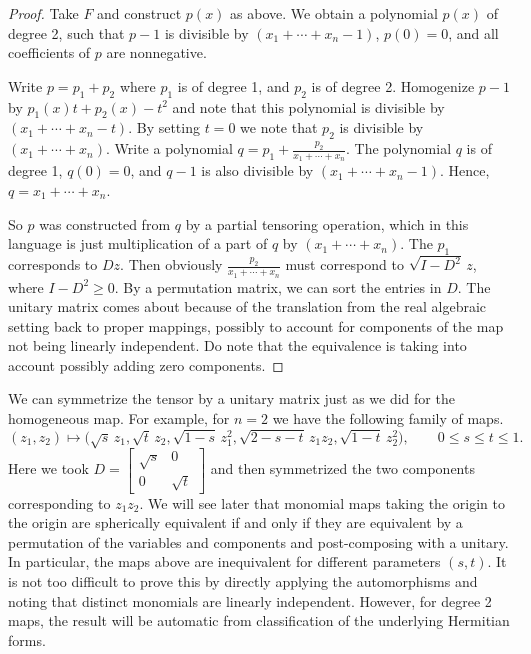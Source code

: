 \documentclass[12pt,openany]{book}
\theoremstyle{plain}
\theoremstyle{remark}
\theoremstyle{definition}
\theoremstyle{exercise}
\theoremstyle{example}
\begin{document}
\begin{proof}
Take $F$ and construct $p(x)$ as above.
We obtain a
polynomial $p(x)$ of degree 2, such that
$p-1$ is divisible by
$(x_1+\cdots+x_n-1)$, $p(0) = 0$, and all coefficients of $p$ are nonnegative.

Write $p = p_1 + p_2$ where $p_1$ is of degree 1, and $p_2$ is of degree 2.
Homogenize $p-1$ by
$p_1(x) t + p_2(x) - t^2$ and note that this polynomial is divisible
by
$(x_1+\cdots+x_n-t)$.  By setting $t=0$ we note that $p_2$ is
divisible by 
$(x_1+\cdots+x_n)$.
Write a polynomial $q = p_1 + \frac{p_2}{x_1+\cdots+x_n}$.
The polynomial $q$ is of degree 1, $q(0) = 0$, and $q-1$ is also divisible by
$(x_1+\cdots+x_n-1)$.
Hence, $q = x_1+\cdots+x_n$.

So $p$ was constructed from $q$ by a partial tensoring
operation, which in this language is just multiplication of a part of $q$
by $(x_1+\cdots+x_n)$.  The $p_1$ corresponds to $Dz$.  Then
obviously 
$\frac{p_2}{x_1+\cdots+x_n}$ must correspond to $\sqrt{I-D^2}\,z$,
where $I-D^2 \geq 0$.
By a permutation matrix, we can sort the entries in $D$.
The unitary matrix comes about because of the translation from
the real algebraic setting back to proper mappings, possibly to account for
components of the map not being linearly independent.  Do note that the
equivalence is taking into account possibly adding zero components.
\end{proof}

We can symmetrize the tensor by a unitary matrix
just as we did for the homogeneous map.
For example, for $n=2$ we have the following family of maps.
\begin{equation}
(z_1,z_2) \mapsto
\bigl(
\sqrt{s} \, z_1,
\sqrt{t} \, z_2,
\sqrt{1-s} \, z_1^2,
\sqrt{2-s-t} \, z_1z_2,
\sqrt{1-t} \, z_2^2 \bigr) , \qquad
0 \leq s \leq t \leq 1.
\end{equation}
Here we took $D =
\left[
\begin{smallmatrix}
\sqrt{s} & 0 \\
0 & \sqrt{t}
\end{smallmatrix}
\right]$ and then symmetrized the two components corresponding to $z_1z_2$.
We will see later that monomial maps taking the origin to the origin
are spherically
equivalent if and only if they are equivalent by a permutation of the
variables and components and post-composing with a unitary.  In particular,
the maps above are inequivalent for different parameters $(s,t)$.
It is not
too difficult to prove this by directly applying the automorphisms and noting
that distinct monomials are linearly independent.  However, for degree 2
maps,
the result will be automatic from classification of the underlying Hermitian
forms.
\end{document}
